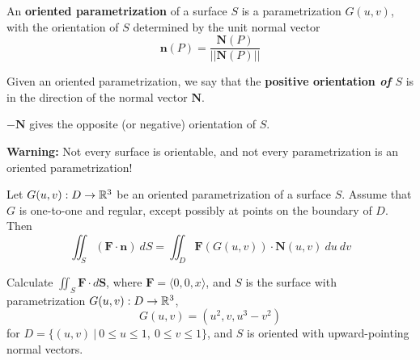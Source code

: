 \begin{definition}
    An \textbf{oriented parametrization} of a surface $S$ is a parametrization $G(u,v)$, with the orientation of $S$ determined by the unit normal vector $$\bm{n}(P) = \frac{\bm{N}(P)}{||\bm{N}(P)||}$$
    
    
    Given an oriented parametrization, we say that the \textbf{positive orientation \textit{of} $S$} is in the direction of the normal vector $\bm{N}$.
    
    \vspace{1em}
    
    $-\bm{N}$ gives the opposite (or negative) orientation of $S$.
    
    \end{definition}

\begin{remark}
    
    \textbf{Warning:} Not every surface is orientable, and not every parametrization is an oriented parametrization!    
    \end{remark}

\begin{center}
        
    \end{center}

 \begin{theorem}
    Let $G(u,v) : D \to \mathbb{R}^3$ be an oriented parametrization of a surface $S$.  Assume that $G$ is one-to-one and regular, except possibly at points on the boundary of $D$.  Then
    $$\iint_S (\bm{F} \cdot \bm{n}) \ dS = \iint_D \bm{F}(G(u,v)) \cdot \bm{N}(u,v) \ du \ dv$$
    
    \end{theorem}

\begin{example}
    Calculate $\iint_S \bm{F} \cdot d\bm{S}$, where $\bm{F} = \langle 0, 0, x\rangle$, and $S$ is the surface with parametrization $G(u,v) : D \to \mathbb{R}^3$, 
    $$G(u,v) = (u^2,v,u^3-v^2)$$
    for $D = \{(u,v) \ |\  0 \leq u \leq 1, \ 0 \leq v \leq 1\}$, and $S$ is oriented with upward-pointing normal vectors.
\end{example}


